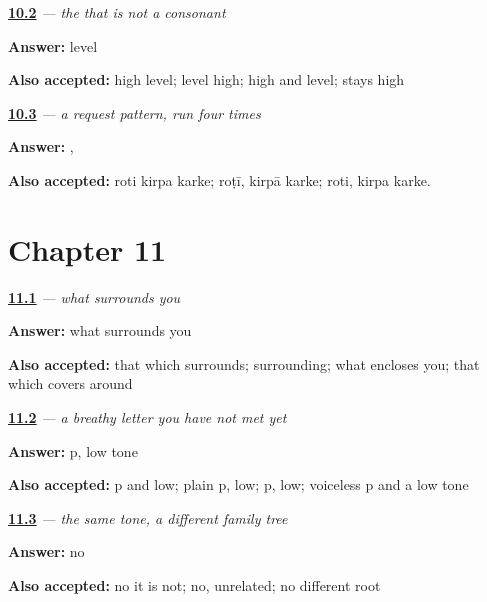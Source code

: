 \noindent\begin{minipage}[t]{\linewidth}
\raggedright
\hyperlink{review-PA-C10-chaa-tone}{\textbf{10.2}} \emph{ — the  that is not a consonant}\par
\small \textbf{Answer:} level\par
\footnotesize \textbf{Also accepted:} high level; level high; high and level; stays high
\end{minipage}\par\medskip

\noindent\begin{minipage}[t]{\linewidth}
\raggedright
\hyperlink{review-PA-C10-roti-requests}{\textbf{10.3}} \emph{ — a request pattern, run four times}\par
\small \textbf{Answer:} ,  \par
\footnotesize \textbf{Also accepted:} roti kirpa karke; roṭī, kirpā karke; roti, kirpa karke.
\end{minipage}\par\medskip

\section*{Chapter 11}

\noindent\begin{minipage}[t]{\linewidth}
\raggedright
\hyperlink{review-PA-C11-parivar-split}{\textbf{11.1}} \emph{ — what surrounds you}\par
\small \textbf{Answer:} what surrounds you\par
\footnotesize \textbf{Also accepted:} that which surrounds; surrounding; what encloses you; that which covers around
\end{minipage}\par\medskip

\noindent\begin{minipage}[t]{\linewidth}
\raggedright
\hyperlink{review-PA-C11-bhara-tone}{\textbf{11.2}} \emph{ — a breathy letter you have not met yet}\par
\small \textbf{Answer:} p, low tone\par
\footnotesize \textbf{Also accepted:} p and low; plain p, low; p, low; voiceless p and a low tone
\end{minipage}\par\medskip

\noindent\begin{minipage}[t]{\linewidth}
\raggedright
\hyperlink{review-PA-C11-bhain-cognate}{\textbf{11.3}} \emph{ — the same tone, a different family tree}\par
\small \textbf{Answer:} no\par
\footnotesize \textbf{Also accepted:} no it is not; no, unrelated; no different root
\end{minipage}\par\medskip

